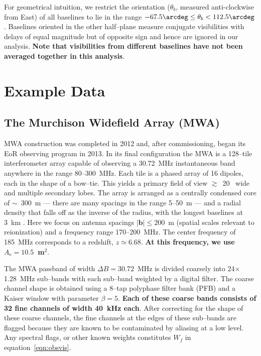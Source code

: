 \documentclass[preprint2,iop,numberedappendix]{emulateapj}
\begin{document}
For geometrical intuition, we restrict the orientation ($\theta_b$, measured anti-clockwise from East) of all baselines to lie in the range $-67.5\arcdeg \leq \theta_b < 112.5\arcdeg$. Baselines oriented in the other half--plane measure conjugate visibilities with delays of equal magnitude but of opposite sign and hence are ignored in our analysis. {\bf Note that visibilities from different baselines have not been averaged together in this analysis}. 

\section{Example Data}\label{sec:instrument}

\subsection{The Murchison Widefield Array (MWA)}

MWA construction was completed in 2012 and, after commissioning, began its EoR observing program in 2013. In its final configuration the MWA is a 128--tile interferometer array capable of observing a 30.72~MHz instantaneous band anywhere in the range 80--300~MHz. Each tile is a phased array of 16 dipoles, each in the shape of a bow--tie. This yields a primary field of view $\gtrsim$~20\arcdeg~ wide and multiple secondary lobes. The array is arranged as a centrally condensed core of $\sim$~300~m --- there are many spacings in the range 5--50~m --- and a radial density that falls off as the inverse of the radius, with the longest baselines at 3~km \citep{bea12}. Here we focus on antenna spacings $|\boldsymbol{b}| \le 200$~m (spatial scales relevant to reionization) and a frequency range 170--200~MHz. The center frequency of 185~MHz corresponds to a redshift, $z\simeq 6.68$. {\bf At this frequency, we use $A_\textrm{e}=10.5$~m$^2$}.

The MWA passband of width $\Delta B=30.72$~MHz is divided coarsely into 24$\times$1.28~MHz sub--bands with each sub--band weighted by a digital filter. The coarse channel shape is obtained using a 8--tap polyphase filter bank (PFB) and a Kaiser window with parameter $\beta=5$. {\bf Each of these coarse bands consists of 32 fine channels of width 40~kHz each}. After correcting for the shape of these coarse channels, the fine channels at the edges of these sub--bands are flagged because they are known to be contaminated by aliasing at a low level. Any spectral flags, or other known weights constitutes $W_f$ in equation~\ref{eqn:obsvis}. 
\end{document}
